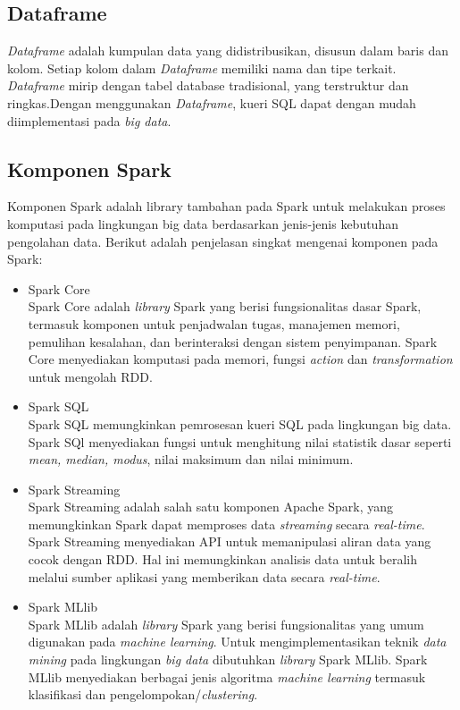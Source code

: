 \subsection{Dataframe}
\label{sec:dataframe}
\textit{Dataframe} adalah kumpulan data yang didistribusikan, disusun dalam baris dan kolom. Setiap kolom dalam \textit{Dataframe} memiliki nama dan tipe terkait. \textit{Dataframe} mirip dengan tabel database tradisional, yang terstruktur dan ringkas.Dengan menggunakan \textit{Dataframe}, kueri SQL dapat dengan mudah diimplementasi pada \textit{big data}.

\subsection{Komponen Spark}
\label{sec:komponen_spark}
Komponen Spark adalah library tambahan pada Spark untuk melakukan proses komputasi pada lingkungan big data berdasarkan jenis-jenis kebutuhan pengolahan data. Berikut adalah penjelasan singkat mengenai komponen pada Spark:

\begin{itemize}
\item Spark Core \\
Spark Core adalah \textit{library} Spark yang berisi fungsionalitas dasar Spark, termasuk komponen untuk penjadwalan tugas, manajemen memori, pemulihan kesalahan, dan berinteraksi dengan sistem penyimpanan. Spark Core menyediakan komputasi pada memori, fungsi \textit{action} dan \textit{transformation} untuk mengolah RDD.

\item Spark SQL  \\
Spark SQL memungkinkan pemrosesan kueri SQL pada lingkungan big data. Spark SQl menyediakan fungsi untuk menghitung nilai statistik dasar seperti \textit{mean, median, modus}, nilai maksimum dan nilai minimum.

\item Spark Streaming \\
Spark Streaming adalah salah satu komponen Apache Spark, yang memungkinkan Spark dapat memproses data \textit{streaming} secara \textit{real-time}. Spark Streaming menyediakan API untuk memanipulasi aliran data yang cocok dengan RDD. Hal ini memungkinkan analisis data untuk beralih melalui sumber aplikasi yang memberikan data secara \textit{real-time}. 

\item
Spark MLlib \\
Spark MLlib adalah \textit{library} Spark yang berisi fungsionalitas yang umum digunakan pada \textit{machine learning}. Untuk mengimplementasikan teknik \textit{data mining} pada lingkungan \textit{big data} dibutuhkan \textit{library} Spark MLlib. Spark MLlib menyediakan berbagai jenis algoritma \textit{machine learning} termasuk klasifikasi dan pengelompokan/\textit{clustering}.
\end{itemize}

